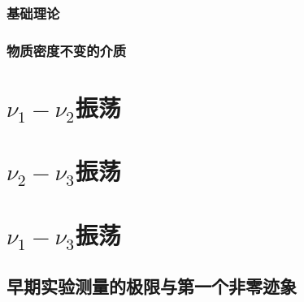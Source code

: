 \documentclass{article}
\begin{document}
	\subsubsection{基础理论}
	\subsubsection{物质密度不变的介质\label{2.5.2}}
	\section{$\nu_1-\nu_2$振荡}
	\section{$\nu_2-\nu_3$振荡}
	\section{$\nu_1-\nu_3$振荡}
	\subsection{早期实验测量的极限与第一个非零迹象\label{5.1}}
	\newpage
	\printbibliography
\end{document}
